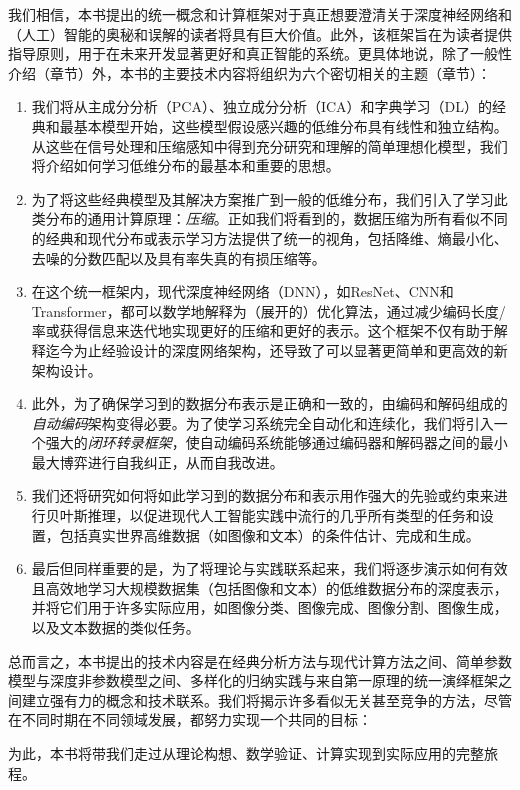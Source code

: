 \documentclass[../../book-main.tex]{subfiles}
\begin{document}
我们相信，本书提出的统一概念和计算框架对于真正想要澄清关于深度神经网络和（人工）智能的奥秘和误解的读者将具有巨大价值。此外，该框架旨在为读者提供指导原则，用于在未来开发显著更好和真正智能的系统。更具体地说，除了一般性介绍（章节）外，本书的主要技术内容将组织为六个密切相关的主题（章节）：
\begin{enumerate}
\item 我们将从主成分分析（PCA）、独立成分分析（ICA）和字典学习（DL）的经典和最基本模型开始，这些模型假设感兴趣的低维分布具有线性和独立结构。从这些在信号处理和压缩感知中得到充分研究和理解的简单理想化模型，我们将介绍如何学习低维分布的最基本和重要的思想。

\item 为了将这些经典模型及其解决方案推广到一般的低维分布，我们引入了学习此类分布的通用计算原理：{\em 压缩}。正如我们将看到的，数据压缩为所有看似不同的经典和现代分布或表示学习方法提供了统一的视角，包括降维、熵最小化、去噪的分数匹配以及具有率失真的有损压缩等。

\item 在这个统一框架内，现代深度神经网络（DNN），如ResNet、CNN和Transformer，都可以数学地解释为（展开的）优化算法，通过减少编码长度/率或获得信息来迭代地实现更好的压缩和更好的表示。这个框架不仅有助于解释迄今为止经验设计的深度网络架构，还导致了可以显著更简单和更高效的新架构设计。

\item 此外，为了确保学习到的数据分布表示是正确和一致的，由编码和解码组成的{\em 自动编码}架构变得必要。为了使学习系统完全自动化和连续化，我们将引入一个强大的{\em 闭环转录框架}，使自动编码系统能够通过编码器和解码器之间的最小最大博弈进行自我纠正，从而自我改进。

\item 我们还将研究如何将如此学习到的数据分布和表示用作强大的先验或约束来进行贝叶斯推理，以促进现代人工智能实践中流行的几乎所有类型的任务和设置，包括真实世界高维数据（如图像和文本）的条件估计、完成和生成。

\item 最后但同样重要的是，为了将理论与实践联系起来，我们将逐步演示如何有效且高效地学习大规模数据集（包括图像和文本）的低维数据分布的深度表示，并将它们用于许多实际应用，如图像分类、图像完成、图像分割、图像生成，以及文本数据的类似任务。
\end{enumerate}

总而言之，本书提出的技术内容是在经典分析方法与现代计算方法之间、简单参数模型与深度非参数模型之间、多样化的归纳实践与来自第一原理的统一演绎框架之间建立强有力的概念和技术联系。我们将揭示许多看似无关甚至竞争的方法，尽管在不同时期在不同领域发展，都努力实现一个共同的目标：
\begin{quote}
\end{quote}
为此，本书将带我们走过从理论构想、数学验证、计算实现到实际应用的完整旅程。
\end{document}
